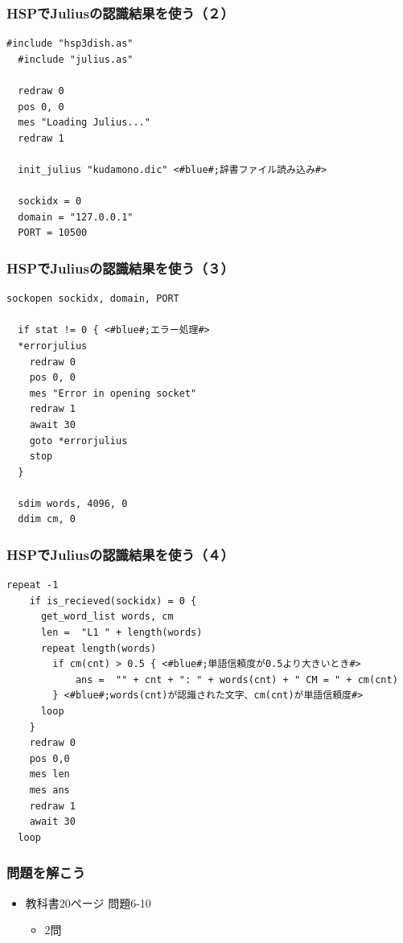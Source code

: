 \documentclass[14pt]{beamer}
\begin{document}
\begin{frame}[fragile]
  \frametitle{HSPでJuliusの認識結果を使う（２）}
  \begin{lstlisting}[caption=julius.hsp,label=julius.hsp]
  #include "hsp3dish.as"
  #include "julius.as"

  redraw 0
  pos 0, 0
  mes "Loading Julius..."
  redraw 1

  init_julius "kudamono.dic" <#blue#;辞書ファイル読み込み#>

  sockidx = 0
  domain = "127.0.0.1"
  PORT = 10500
  \end{lstlisting}
\end{frame}

\begin{frame}[fragile]
  \frametitle{HSPでJuliusの認識結果を使う（３）}
  \begin{lstlisting}[caption=julius.hsp,label=julius.hsp]
  sockopen sockidx, domain, PORT

  if stat != 0 { <#blue#;エラー処理#>
  *errorjulius
    redraw 0
    pos 0, 0
    mes "Error in opening socket"
    redraw 1
    await 30
    goto *errorjulius
    stop
  }

  sdim words, 4096, 0
  ddim cm, 0
  \end{lstlisting}
\end{frame}

\begin{frame}[fragile]
  \frametitle{HSPでJuliusの認識結果を使う（４）}
  \begin{lstlisting}[caption=julius.hsp,label=julius.hsp,basicstyle=\scriptsize]
  repeat -1
    if is_recieved(sockidx) = 0 {
      get_word_list words, cm
      len =  "L1 " + length(words)
      repeat length(words)
        if cm(cnt) > 0.5 { <#blue#;単語信頼度が0.5より大きいとき#>
            ans =  "" + cnt + ": " + words(cnt) + " CM = " + cm(cnt)
        } <#blue#;words(cnt)が認識された文字、cm(cnt)が単語信頼度#>
      loop
    }
    redraw 0
    pos 0,0
    mes len
    mes ans
    redraw 1
    await 30
  loop
  \end{lstlisting}
\end{frame}

\begin{frame}
  \frametitle{問題を解こう}
  \begin{itemize}
    \item 教科書20ページ 問題6-10
    \begin{itemize}
      \item 2問
    \end{itemize}
  \end{itemize}
\end{frame}
\end{document}
